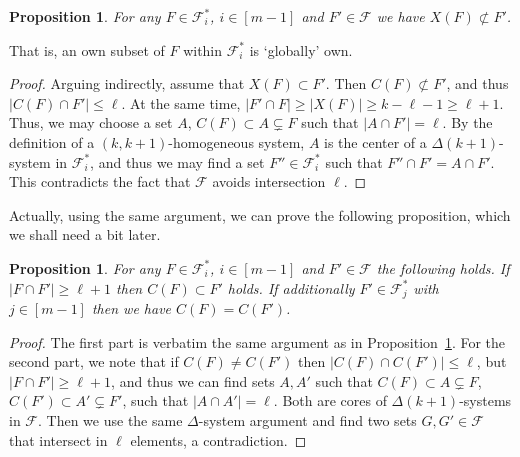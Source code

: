 \documentclass[graybox]{svmult}
\renewcommand{\le}{\leqslant}
\renewcommand{\ge}{\geqslant}
\newcommand{\ff}{\mathcal{F}}
\newtheorem{prop}[thm]{Proposition}
\begin{document}
\begin{prop}\label{propglob1}
  For any $F\in \ff_i^*$, $i\in [m-1]$ and $F'\in \ff$ we have $X(F)\not\subset F'$.
\end{prop}
That is, an own subset of $F$ within $\ff_i^*$ is `globally' own.
\begin{proof}
  Arguing indirectly, assume that $X(F)\subset F'$. Then $C(F)\not\subset F'$, and thus $|C(F)\cap F'|\le \ell$. At the same time, $|F'\cap F|\ge |X(F)|\ge k-\ell-1\ge \ell+1$.  Thus, we may choose a set $A$, $C(F)\subset A\subsetneq F$ such that $|A\cap F'| = \ell$. By the definition of a $(k,k+1)$-homogeneous system, $A$ is the center of a $\Delta(k+1)$-system in $\ff_i^*$, and thus we may find a set $F''\in \ff_i^*$ such that $F''\cap F' = A\cap F'$. This contradicts the fact that $\ff$ avoids intersection $\ell$.
\end{proof}
Actually, using the same argument, we can prove the following proposition, which we shall need a bit later.

\begin{prop}\label{propglob2}
  For any $F\in \ff_i^*$, $i\in [m-1]$ and $F'\in \ff$ the following holds. If $|F\cap F'|\ge \ell+1$ then $C(F)\subset F'$ holds. If additionally $F'\in \ff_j^*$ with $j\in [m-1]$ then we have $C(F)=C(F')$.
\end{prop}
\begin{proof}
  The first part is verbatim the same argument as in Proposition~\ref{propglob1}. For the second part, we note that if $C(F)\ne C(F')$ then $|C(F)\cap C(F')|\le \ell$, but $|F\cap F'|\ge \ell+1$, and thus we can find sets $A, A'$ such that $C(F)\subset A\subsetneq F$,  $C(F')\subset A'\subsetneq F'$, such that $|A\cap A'|=\ell$. Both are cores of $\Delta(k+1)$-systems in $\ff$. Then we use the same $\Delta$-system argument and find two sets $G,G'\in \ff$ that intersect in $\ell$ elements, a contradiction.
\end{proof}
\end{document}
